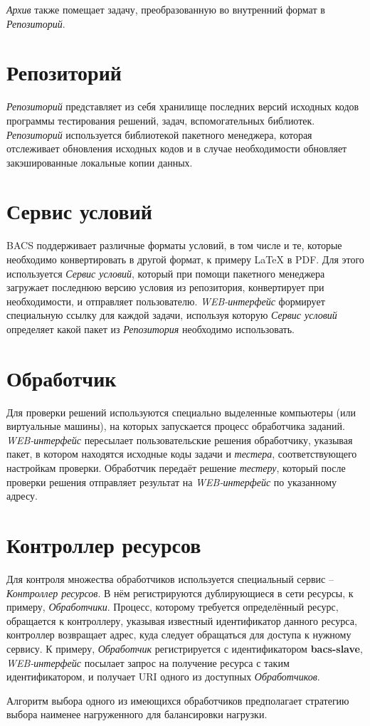 \textit{Архив} также помещает задачу, преобразованную во внутренний формат в \textit{Репозиторий}.

\section{Репозиторий}
\textit{Репозиторий} представляет из себя хранилище последних версий исходных кодов
программы тестирования решений, задач, вспомогательных библиотек.
\textit{Репозиторий} используется библиотекой пакетного менеджера,
которая отслеживает обновления исходных кодов и в случае необходимости
обновляет закэшированные локальные копии данных.

\section{Сервис условий}
BACS поддерживает различные форматы условий, в том числе и те, которые необходимо
конвертировать в другой формат, к примеру LaTeX в PDF. Для этого используется
\textit{Сервис условий}, который при помощи пакетного менеджера загружает последнюю
версию условия из репозитория, конвертирует при необходимости,
и отправляет пользователю. \textit{WEB-интерфейс} формирует специальную ссылку
для каждой задачи, используя которую \textit{Сервис условий} определяет
какой пакет из \textit{Репозитория} необходимо использовать.

\section{Обработчик}
Для проверки решений используются специально выделенные компьютеры (или виртуальные машины),
на которых запускается процесс обработчика заданий.
\textit{WEB-интерфейс} пересылает пользовательские решения обработчику, указывая пакет,
в котором находятся исходные коды задачи и \textit{тестера}, соответствующего
настройкам проверки. Обработчик передаёт решение \textit{тестеру}, который
после проверки решения отправляет результат на \textit{WEB-интерфейс} по указанному адресу.

\section{Контроллер ресурсов}
Для контроля множества обработчиков используется специальный сервис -- \textit{Контроллер ресурсов}.
В нём регистрируются дублирующиеся в сети ресурсы, к примеру, \textit{Обработчики}.
Процесс, которому требуется определённый ресурс, обращается к контроллеру,
указывая известный идентификатор данного ресурса,
контроллер возвращает адрес, куда следует обращаться для доступа к нужному сервису.
К примеру, \textit{Обработчик} регистрируется с идентификатором \textbf{bacs-slave},
\textit{WEB-интерфейс} посылает запрос на получение ресурса с таким идентификатором,
и получает URI одного из доступных \textit{Обработчиков}.

Алгоритм выбора одного из имеющихся обработчиков предполагает
стратегию выбора наименее нагруженного для балансировки нагрузки.
